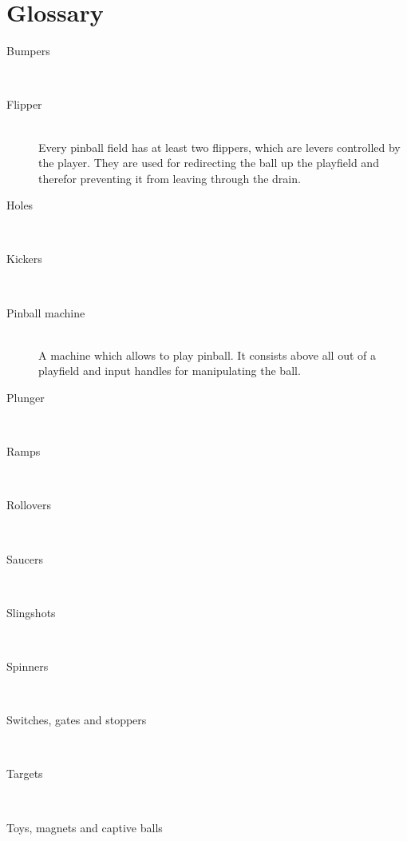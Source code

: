 \documentclass[fontsize=12pt,
               paper=a4,
               twoside=false,
               parskip=half,
               ]{scrartcl}
\begin{document}
\newcommand{\doctitle}{Glossary}


\section*{Glossary}

\begin{description}

\item[Bumpers] \hfill \\

\item[Flipper] \hfill \\
Every pinball field has at least two flippers, which are levers controlled by the player. They are used for redirecting the ball up the playfield and therefor preventing it from leaving through the drain.

\item[Holes] \hfill \\

\item[Kickers] \hfill \\

\item[Pinball machine] \hfill \\
A machine which allows to play pinball. It consists above all out of a playfield and input handles for manipulating the ball.

\item[Plunger] \hfill \\

\item[Ramps] \hfill \\

\item[Rollovers] \hfill \\

\item[Saucers] \hfill \\

\item[Slingshots] \hfill \\

\item[Spinners] \hfill \\

\item[Switches, gates and stoppers] \hfill \\

\item[Targets] \hfill \\

\item[Toys, magnets and captive balls] \hfill \\

\end{description}
\end{document}
